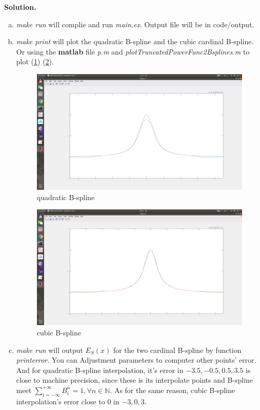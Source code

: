 \documentclass[a4paper]{book}
\newenvironment{solution}%
{\noindent\textbf{Solution.}}%
{\qedhere}
\numberwithin{equation}{chapter}
\theoremstyle{definition}
\begin{document}
\begin{solution}
  \begin{enumerate}[(a)]
  \item \textit{make run} will complie and run \textit{main.ex}. Output file will be in code/output.

  \item \textit{make print} will plot the quadratic B-spline and the cubic cardinal B-spline.
    Or using the \textbf{matlab} file \textit{p.m} and \textit{plotTruncatedPowerFunc2Bsplines.m} to plot (\ref{fig:1}) (\ref{fig:2}).

    \begin{figure}
      \centering
      \includegraphics[scale = 0.25]{quadraticBspline}
      \caption{quadratic B-spline}\label{fig:1}
    \end{figure}
    \begin{figure}
      \centering
      \includegraphics[scale = 0.25]{cubicBspline}
      \caption{cubic B-spline}\label{fig:2}
    \end{figure}

  \item \textit{make run} will output $E_S(x)$ for the two cardinal B-spline by function \textit{printerror}. You can Adjustment parameters to computer other points' error. And for quadratic B-spline interpolation, it's error in $-3.5, -0.5, 0.5, 3.5$ is close to machine precision, since these is its interpolate points and B-spline meet $\sum\limits_{i = -\infty}^{+\infty} B_i^n = 1, \forall n \in \mathbb{N}$. As for the same reason, cubic B-spline interpolation's error close to $0$ in $-3, 0, 3$. 


\end{enumerate}
\end{solution}
\end{document}

